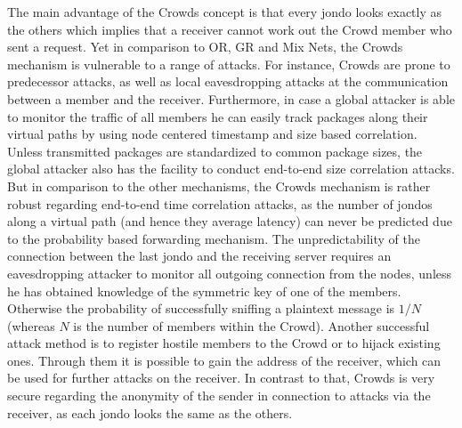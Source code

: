 \documentclass{sig-alternate}
\begin{document}
The main advantage of the Crowds concept is that every jondo looks exactly as the others which implies that a receiver cannot work out the Crowd member who sent a request. Yet in comparison to OR, GR and Mix Nets, the Crowds mechanism is vulnerable to a range of attacks. For instance, Crowds are prone to predecessor attacks, as well as local eavesdropping attacks at the communication between a member and the receiver. Furthermore, in case a global attacker is able to monitor the traffic of all members he can easily track packages along their virtual paths by using node centered timestamp and size based correlation. Unless transmitted packages are standardized to common package sizes, the global attacker also has the facility to conduct end-to-end size correlation attacks. But in comparison to the other mechanisms, the Crowds mechanism is rather robust regarding end-to-end time correlation attacks, as the number of jondos along a virtual path (and hence they average latency) can never be predicted due to the probability based forwarding mechanism. The unpredictability of the connection between the last jondo and the receiving server requires an eavesdropping attacker to monitor all outgoing connection from the nodes, unless he has obtained knowledge of the symmetric key of one of the members. Otherwise the probability of successfully sniffing a plaintext message is $1 / N$ (whereas $N$ is the number of members within the Crowd). Another successful attack method is to register hostile members to the Crowd or to hijack existing ones. Through them it is possible to gain the address of the receiver, which can be used for further attacks on the receiver. In contrast to that, Crowds is very secure regarding the anonymity of the sender in connection to attacks via the receiver, as each jondo looks the same as the others. 
\end{document}
